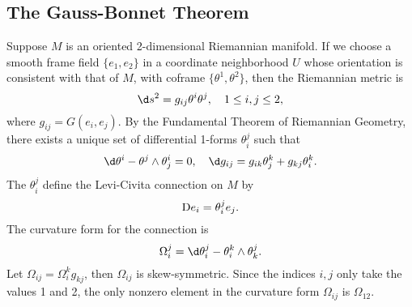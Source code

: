 \documentclass[11pt]{article}
\begin{document}
\subsection{The Gauss-Bonnet Theorem}

Suppose $M$ is an oriented 2-dimensional Riemannian manifold. If we choose a smooth frame field $\{e_1, e_2\}$ in a coordinate neighborhood $U$ whose orientation is consistent with that of $M$, with coframe $\{\theta^1, \theta^2\}$, then the Riemannian metric is $$\d s^2 = g_{ij}\theta^i\theta^j, \quad 1 \le i, j \le 2,$$ where $g_{ij} = G(e_i, e_j)$. By the Fundamental Theorem of Riemannian Geometry, there exists a unique set of differential 1-forms $\theta^j_i$ such that $$\d\theta^i - \theta^j \wedge \theta^i_j = 0, \quad \d g_{ij} = g_{ik}\theta^k_j + g_{kj}\theta^k_i.$$ The $\theta^j_i$ define the Levi-Civita connection on $M$ by $$\text{D} e_i = \theta^j_i e_j.$$ The curvature form for the connection is $$\Omega^j_i = \d\theta^j_i - \theta^k_i \wedge \theta^j_k.$$ Let $\Omega_{ij} = \Omega^k_ig_{kj}$, then $\Omega_{ij}$ is skew-symmetric. Since the indices $i, j$ only take the values 1 and 2, the only nonzero element in the curvature form $\Omega_{ij}$ is $\Omega_{12}$. 
\end{document}
